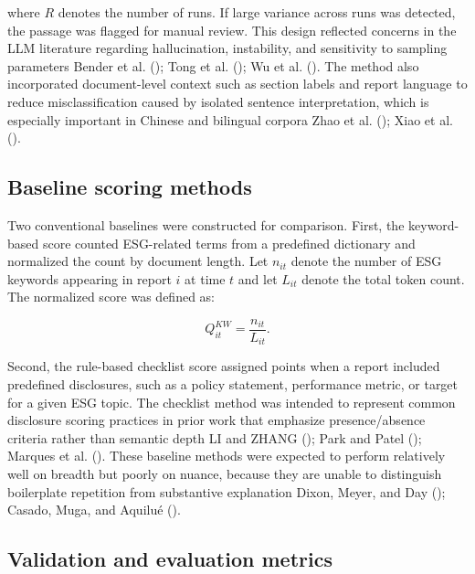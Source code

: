 \documentclass[
  12pt,
]{article}
\begin{document}
where \(R\) denotes the number of runs. If large variance across runs
was detected, the passage was flagged for manual review. This design
reflected concerns in the LLM literature regarding hallucination,
instability, and sensitivity to sampling parameters Bender et al.
(); Tong et al.
(); Wu et al.
(). The method also incorporated
document-level context such as section labels and report language to
reduce misclassification caused by isolated sentence interpretation,
which is especially important in Chinese and bilingual corpora Zhao et
al. (); Xiao et al.
().

\subsection{Baseline scoring methods}\label{baseline-scoring-methods}

Two conventional baselines were constructed for comparison. First, the
keyword-based score counted ESG-related terms from a predefined
dictionary and normalized the count by document length. Let \(n_{it}\)
denote the number of ESG keywords appearing in report \(i\) at time
\(t\) and let \(L_{it}\) denote the total token count. The normalized
score was defined as:

\[
Q^{KW}_{it} = \frac{n_{it}}{L_{it}}.
\]

Second, the rule-based checklist score assigned points when a report
included predefined disclosures, such as a policy statement, performance
metric, or target for a given ESG topic. The checklist method was
intended to represent common disclosure scoring practices in prior work
that emphasize presence/absence criteria rather than semantic depth LI
and ZHANG (); Park and Patel
(); Marques et al.
(). These baseline methods were expected
to perform relatively well on breadth but poorly on nuance, because they
are unable to distinguish boilerplate repetition from substantive
explanation Dixon, Meyer, and Day ();
Casado, Muga, and Aquilué ().

\subsection{Validation and evaluation
metrics}\label{validation-and-evaluation-metrics}
\end{document}
